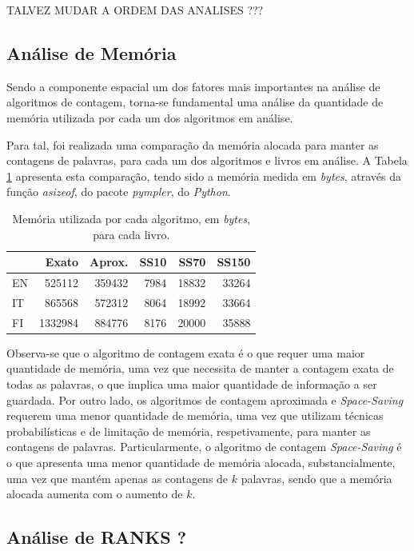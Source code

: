 \documentclass[mirror, portugues]{revdetua}
\begin{document}
TALVEZ MUDAR A ORDEM DAS ANALISES ??? %

\subsection{Análise de Memória}

Sendo a componente espacial um dos fatores mais importantes na análise de algoritmos de contagem, torna-se fundamental uma análise da quantidade de memória utilizada por cada um dos algoritmos em análise.

Para tal, foi realizada uma comparação da memória alocada para manter as contagens de palavras, para cada um dos algoritmos e livros em análise. A Tabela \ref{table:memoria} apresenta esta comparação, tendo sido a memória medida em \textit{bytes}, através da função \textit{asizeof}, do pacote \textit{pympler}, do \textit{Python}.

\begin{table}[H]
\centering
\caption{Memória utilizada por cada algoritmo, em \textit{bytes}, para cada livro.}
\label{table:memoria}
\begin{tabular}{lrrrrr}
\toprule
& Exato & Aprox. & SS10 & SS70 & SS150 \\
\midrule
EN & 525112 & 359432 & 7984 & 18832 & 33264 \\
IT & 865568 & 572312 & 8064 & 18992 & 33664 \\
FI &1332984 & 884776 & 8176 & 20000 & 35888 \\
\bottomrule
\end{tabular}
\end{table}

Observa-se que o algoritmo de contagem exata é o que requer uma maior quantidade de memória, uma vez que necessita de manter a contagem exata de todas as palavras, o que implica uma maior quantidade de informação a ser guardada. Por outro lado, os algoritmos de contagem aproximada e \textit{Space-Saving} requerem uma menor quantidade de memória, uma vez que utilizam técnicas probabilísticas e de limitação de memória, respetivamente, para manter as contagens de palavras. Particularmente, o algoritmo de contagem \textit{Space-Saving} é o que apresenta uma menor quantidade de memória alocada, substancialmente, uma vez que mantém apenas as contagens de $k$ palavras, sendo que a memória alocada aumenta com o aumento de $k$.

\subsection{Análise de RANKS ?} %
\end{document}
